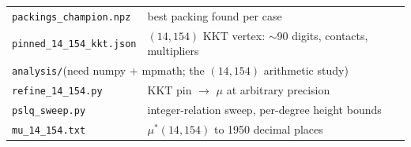 \documentclass[11pt,a4paper]{article}
\begin{document}
{\begin{longtable}{ll}
\quad\texttt{packings\_champion.npz}       & best packing found per case \\
\quad\texttt{pinned\_14\_154\_kkt.json}      & $(14,154)$ KKT vertex: $\sim$90 digits, contacts, multipliers \\
\multicolumn{2}{l}{\texttt{analysis/}\quad (need numpy + mpmath; the $(14,154)$ arithmetic study)} \\
\quad\texttt{refine\_14\_154.py}            & KKT pin $\to$ $\mu$ at arbitrary precision \\
\quad\texttt{pslq\_sweep.py}                & integer-relation sweep, per-degree height bounds \\
\quad\texttt{mu\_14\_154.txt}               & $\mu^*(14,154)$ to 1950 decimal places \\
\bottomrule
\end{longtable}}
\end{document}
